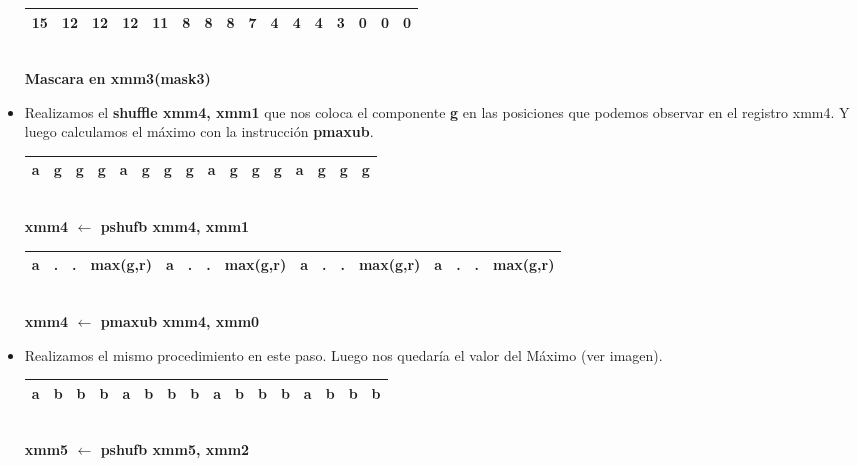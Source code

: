 \begin{itemize}
		\begin{center}
		   \begin{tabular}{| c | c | c | c || c | c | c | c || c | c | c | c || c | c | c | c |}
			 \hline
			 15 & 12 & 12 & 12 & 11 & 8 & 8 & 8 & 7 & 4 & 4 & 4 & 3 & 0 & 0 & 0 \\ \hline
		   \end{tabular}
		   \\ \textbf{Mascara en xmm3(mask3)}
		\end{center}

	\item Realizamos el \textbf{shuffle xmm4, xmm1} que nos coloca el componente \textbf{g} en las posiciones que podemos observar en el registro xmm4. Y luego calculamos el máximo con la instrucción \textbf{pmaxub}. 

		\begin{center}
		   \begin{tabular}{| c | c | c | c || c | c | c | c || c | c | c | c || c | c | c | c |}
			 \hline
			 a & g & g & g & a & g & g & g & a & g & g & g & a & g & g & g \\ \hline
		   \end{tabular}
		   \\ \textbf{xmm4 $\gets$ pshufb xmm4, xmm1}
		\end{center}


		\begin{center}
		   \begin{tabular}{| c | c | c | c || c | c | c | c || c | c | c | c || c | c | c | c |}
			 \hline
			 a & . & . & max(g,r) & a & . & . & max(g,r) & a & . & . & max(g,r) & a & . & . & max(g,r)  \\ \hline
		   \end{tabular}
		   \\ \textbf{xmm4 $ \gets $ pmaxub xmm4, xmm0}
		\end{center}

	\item Realizamos el mismo procedimiento en este paso. Luego nos quedaría el valor del Máximo (ver imagen). 
		\begin{center}
		   \begin{tabular}{| c | c | c | c || c | c | c | c || c | c | c | c || c | c | c | c |}
			 \hline
			 a & b & b & b & a & b & b & b & a & b & b & b & a & b & b & b \\ \hline
		   \end{tabular}
		   \\ \textbf{xmm5 $\gets$ pshufb xmm5, xmm2}
		\end{center}


\end{itemize}
